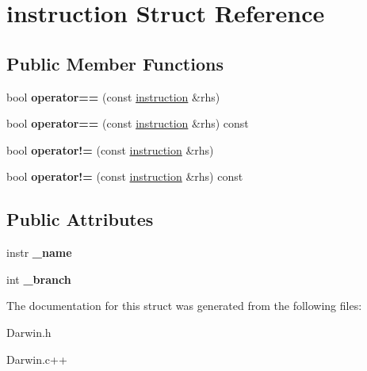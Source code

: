 \hypertarget{structinstruction}{\section{instruction Struct Reference}
\label{structinstruction}
}
\subsection*{Public Member Functions}
\begin{DoxyCompactItemize}
\item 
\hypertarget{structinstruction_afd5646de69b733437f72893c5c533319}{bool {\bfseries operator==} (const \hyperlink{structinstruction}{instruction} \&rhs)}\label{structinstruction_afd5646de69b733437f72893c5c533319}

\item 
\hypertarget{structinstruction_a4263ab93787e7f4e4a840a264d373b73}{bool {\bfseries operator==} (const \hyperlink{structinstruction}{instruction} \&rhs) const }\label{structinstruction_a4263ab93787e7f4e4a840a264d373b73}

\item 
\hypertarget{structinstruction_a7553cf6e629ec03d49c600e606876443}{bool {\bfseries operator!=} (const \hyperlink{structinstruction}{instruction} \&rhs)}\label{structinstruction_a7553cf6e629ec03d49c600e606876443}

\item 
\hypertarget{structinstruction_a9360fe28e0f897f5c97fb475a0da9e68}{bool {\bfseries operator!=} (const \hyperlink{structinstruction}{instruction} \&rhs) const }\label{structinstruction_a9360fe28e0f897f5c97fb475a0da9e68}

\end{DoxyCompactItemize}
\subsection*{Public Attributes}
\begin{DoxyCompactItemize}
\item 
\hypertarget{structinstruction_adb357a4b561de59d9fe625388de76cc4}{instr {\bfseries \-\_\-name}}\label{structinstruction_adb357a4b561de59d9fe625388de76cc4}

\item 
\hypertarget{structinstruction_a6b6bfb13f4a5b8647c364cd4bf2d1470}{int {\bfseries \-\_\-branch}}\label{structinstruction_a6b6bfb13f4a5b8647c364cd4bf2d1470}

\end{DoxyCompactItemize}


The documentation for this struct was generated from the following files\-:\begin{DoxyCompactItemize}
\item 
Darwin.\-h\item 
Darwin.\-c++\end{DoxyCompactItemize}
